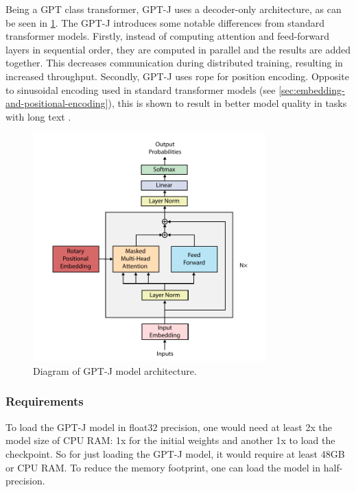 Being a GPT class transformer, GPT-J uses a decoder-only architecture, as can be seen in \cref{fig:gpt-j-architecture}. The GPT-J introduces some notable differences from standard transformer models. Firstly, instead of computing attention and feed-forward layers in sequential order, they are computed in parallel and the results are added together. This decreases communication during distributed training, resulting in increased throughput. Secondly, GPT-J uses \acrfull{rope} \cite{su2021roformer} for position encoding. Opposite to sinusoidal encoding used in standard transformer models (see \cref{sec:embedding-and-positional-encoding}), this is shown to result in better model quality in tasks with long text \cite{su2021roformer}.

\begin{figure}[htbp]
    \centering
    \includegraphics[width=0.8\textwidth]{figures/gpt-j_architecture.pdf}
    \caption{Diagram of GPT-J model architecture.}
    \label{fig:gpt-j-architecture}
\end{figure}

\subsubsection{Requirements}
\label{sec:requirements}
To load the GPT-J model in float32 precision, one would need at least 2x the model size of CPU RAM: 1x for the initial weights and another 1x to load the checkpoint. So for just loading the GPT-J model, it would require at least 48GB or CPU RAM. To reduce the memory footprint, one can load the model in half-precision.

